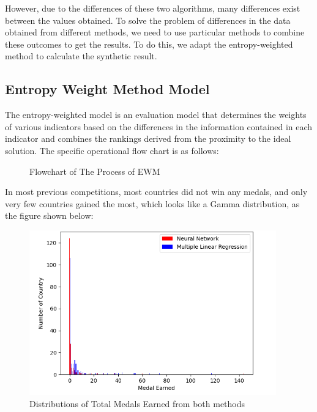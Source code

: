 \documentclass{mcmthesis}
\begin{document}
However, due to the differences of these two algorithms, many differences exist between the values obtained. To solve the problem of differences in the data obtained from different methods, we need to use particular methods to combine these outcomes to get the results. To do this, we adapt the entropy-weighted method to calculate the synthetic result.

\subsection{Entropy Weight Method Model}
The entropy-weighted model is an evaluation model that determines the weights of various indicators based on the differences in the information contained in each indicator and combines the rankings derived from the proximity to the ideal solution. The specific operational flow chart is as follows:
\begin{figure}[H]
\centering
{}
\caption{Flowchart of The Process of EWM}
\label{fig:flowchart}
\end{figure}
In most previous competitions, most countries did not win any medals, and only very few countries gained the most, which looks like a Gamma distribution, as the figure shown below:\\
\begin{figure}[H]
  \centering
  \includegraphics[width=0.95\textwidth]{myplot} %
  \caption{Distributions of Total Medals Earned from both methods}
  \label{exampleId}
\end{figure}
\end{document}
